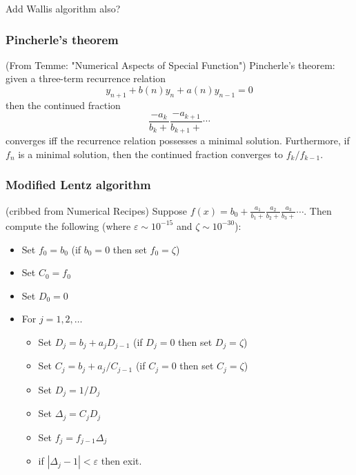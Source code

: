 \documentclass[10pt,dvipdfmx,letterpaper,twoside]{article}
\let\eps=\varepsilon
\begin{document}
Add Wallis algorithm also?

\subsubsection{Pincherle's theorem}
(From Temme: "Numerical Aspects of Special Function")
Pincherle's theorem: given a three-term recurrence relation
\[ y_{n+1} + b(n) y_n + a(n) y_{n-1} = 0 \]
then the continued fraction
\[ \frac{-a_k}{b_k + } \frac{-a_{k+1}}{b_{k+1} + } \cdots \]
converges iff the recurrence relation possesses a minimal solution.  Furthermore,
if $f_n$ is a minimal solution, then the continued fraction converges to $f_k/f_{k-1}$.

\subsubsection{Modified Lentz algorithm}
(cribbed from Numerical Recipes)
Suppose $f(x) = b_0 + \frac{a_1}{b_1 +} \frac{a_2}{b_2 +} \frac{a_3}{b_3 +} \cdots$.
Then compute the following (where $\eps\sim10^{-15}$ and $\zeta\sim10^{-30}$):
\begin{itemize}
\item Set $f_0 = b_0$ (if $b_0=0$ then set $f_0=\zeta$)
\item Set $C_0 = f_0$
\item Set $D_0 = 0$
\item For $j=1, 2, \dots$
  \begin{itemize}
  \item Set $D_j = b_j + a_j D_{j-1}$ (if $D_j = 0$ then set $D_j = \zeta$)
  \item Set $C_j = b_j + a_j / C_{j-1}$ (if $C_j = 0$ then set $C_j = \zeta$)
  \item Set $D_j = 1/D_j$
  \item Set $\Delta_j = C_j D_j$
  \item Set $f_j = f_{j-1} \Delta_j$
  \item if $|\Delta_j -1|<\eps$ then exit.
  \end{itemize}
\end{itemize}

\end{document}
